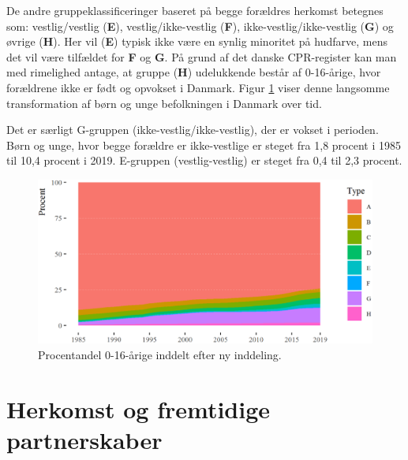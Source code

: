 \documentclass[
]{book}
\begin{document}
De andre gruppeklassificeringer baseret på begge forældres herkomst betegnes som: vestlig/vestlig (\textbf{E}), vestlig/ikke-vestlig (\textbf{F}), ikke-vestlig/ikke-vestlig (\textbf{G}) og øvrige (\textbf{H}). Her vil (\textbf{E}) typisk ikke være en synlig minoritet på hudfarve, mens det vil være tilfældet for \textbf{F} og \textbf{G}. På grund af det danske CPR-register kan man med rimelighed antage, at gruppe (\textbf{H}) udelukkende består af 0-16-årige, hvor forældrene ikke er født og opvokset i Danmark. Figur \ref{fig:fig-3-01} viser denne langsomme transformation af børn og unge befolkningen i Danmark over tid.

Det er særligt G-gruppen (ikke-vestlig/ikke-vestlig), der er vokset i perioden. Børn og unge, hvor begge forældre er ikke-vestlige er steget fra 1,8 procent i 1985 til 10,4 procent i 2019. E-gruppen (vestlig-vestlig) er steget fra 0,4 til 2,3 procent.

\begin{figure}
\includegraphics[width=1\linewidth]{images/figur_3_1} \caption{ Procentandel 0-16-årige inddelt efter ny inddeling.}\label{fig:fig-3-01}
\end{figure}

\section{Herkomst og fremtidige partnerskaber}\label{herkomst-og-fremtidige-partnerskaber}
\end{document}
